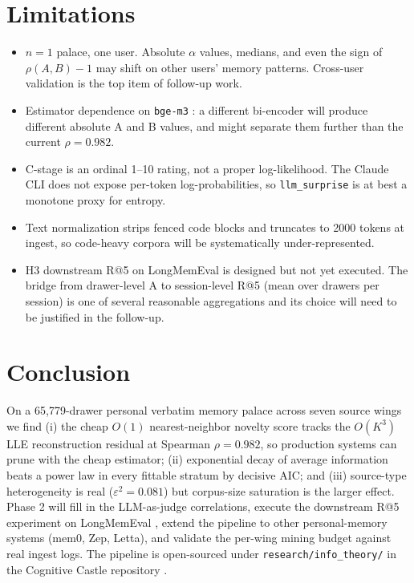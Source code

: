 \documentclass[11pt]{article}
\begin{document}
\section{Limitations}
\label{sec:limitations}
\begin{itemize}
  \item $n = 1$ palace, one user. Absolute $\alpha$ values, medians,
    and even the sign of $\rho(A, B) - 1$ may shift on other users'
    memory patterns. Cross-user validation is the top item of
    follow-up work.
  \item Estimator dependence on \texttt{bge-m3} \citep{bgem3}: a
    different bi-encoder will produce different absolute A and B values,
    and might separate them further than the current $\rho = 0.982$.
  \item C-stage is an ordinal 1--10 rating, not a proper log-likelihood.
    The Claude CLI does not expose per-token log-probabilities, so
    \texttt{llm\_surprise} is at best a monotone proxy for entropy.
  \item Text normalization strips fenced code blocks and truncates to
    2000 tokens at ingest, so code-heavy corpora will be systematically
    under-represented.
  \item H3 downstream R@5 on LongMemEval \citep{longmemeval} is
    designed but not yet executed. The bridge from drawer-level A to
    session-level R@5 (mean over drawers per session) is one of several
    reasonable aggregations and its choice will need to be justified in
    the follow-up.
\end{itemize}

\section{Conclusion}
\label{sec:conclusion}
On a 65{,}779-drawer personal verbatim memory palace across seven source
wings we find (i) the cheap $O(1)$ nearest-neighbor novelty score
tracks the $O(K^3)$ LLE reconstruction residual at Spearman
$\rho = 0.982$, so production systems can prune with the cheap
estimator; (ii) exponential decay of average information beats a power
law in every fittable stratum by decisive AIC; and (iii) source-type
heterogeneity is real ($\varepsilon^2 = 0.081$) but corpus-size
saturation is the larger effect. Phase 2 will fill in the LLM-as-judge
correlations, execute the downstream R@5 experiment on
LongMemEval \citep{longmemeval}, extend the pipeline to other
personal-memory systems (mem0, Zep, Letta), and validate the per-wing
mining budget against real ingest logs. The pipeline is open-sourced
under \texttt{research/info\_theory/} in the Cognitive Castle repository
\citep{cognitivecastle}.





\end{document}
